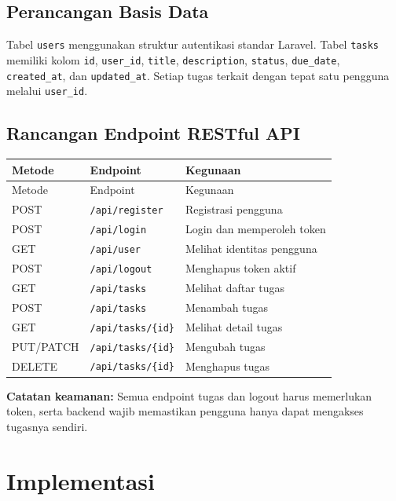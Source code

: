 \documentclass[12pt,a4paper]{report}
\begin{document}
\section{Perancangan Basis Data}
Tabel \texttt{users} menggunakan struktur autentikasi standar Laravel. Tabel \texttt{tasks} memiliki kolom \texttt{id}, \texttt{user\_id}, \texttt{title}, \texttt{description}, \texttt{status}, \texttt{due\_date}, \texttt{created\_at}, dan \texttt{updated\_at}. Setiap tugas terkait dengan tepat satu pengguna melalui \texttt{user\_id}.

\section{Rancangan Endpoint RESTful API}
\begin{longtable}{p{2cm}p{5cm}p{4.7cm}}
\toprule Metode & Endpoint & Kegunaan\\\midrule\endfirsthead
\toprule Metode & Endpoint & Kegunaan\\\midrule\endhead
POST & \texttt{/api/register} & Registrasi pengguna\\
POST & \texttt{/api/login} & Login dan memperoleh token\\
GET & \texttt{/api/user} & Melihat identitas pengguna\\
POST & \texttt{/api/logout} & Menghapus token aktif\\
GET & \texttt{/api/tasks} & Melihat daftar tugas\\
POST & \texttt{/api/tasks} & Menambah tugas\\
GET & \texttt{/api/tasks/\{id\}} & Melihat detail tugas\\
PUT/PATCH & \texttt{/api/tasks/\{id\}} & Mengubah tugas\\
DELETE & \texttt{/api/tasks/\{id\}} & Menghapus tugas\\
\bottomrule
\end{longtable}
\noindent\textbf{Catatan keamanan:} Semua endpoint tugas dan logout harus memerlukan token, serta backend wajib memastikan pengguna hanya dapat mengakses tugasnya sendiri.

\chapter{Implementasi}
\end{document}
